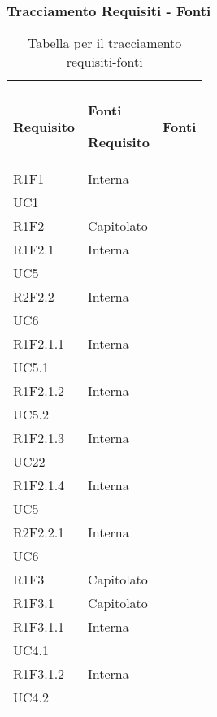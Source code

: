 \newpage
\subsubsection{Tracciamento Requisiti - Fonti}

\renewcommand{\arraystretch}{2.2}

\begin{longtable}{|C{6.5cm}|C{6.5cm}|}
	\caption{Tabella per il tracciamento requisiti-fonti}\\
	\textbf{Requisito} & \textbf{Fonti}
	\endfirsthead

	\hline

	\textbf{Requisito} & \textbf{Fonti}
	\tabularnewline
	\endhead

	R1F1 & \centering Interna \\ UC1 \tabularnewline

	R1F2 & Capitolato \\

	R1F2.1 & \centering Interna \\ UC5 \tabularnewline

	R2F2.2 & \centering Interna \\ UC6 \tabularnewline


	R1F2.1.1 &   \centering Interna \\ UC5.1 \tabularnewline

	R1F2.1.2 &  \centering Interna \\ UC5.2 \tabularnewline

	R1F2.1.3 &  \centering Interna \\ UC22 \tabularnewline
	
	R1F2.1.4 &   \centering Interna \\ UC5 \tabularnewline

	R2F2.2.1 &  \centering Interna \\ UC6 \tabularnewline

	R1F3 & Capitolato \\

	R1F3.1 & Capitolato \\

	R1F3.1.1 &  \centering Interna \\ UC4.1 \tabularnewline

	R1F3.1.2 &  \centering Interna \\ UC4.2 \tabularnewline


\end{longtable}
